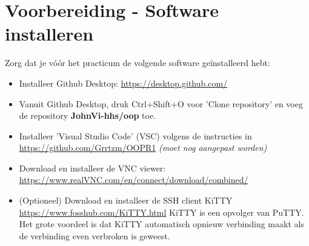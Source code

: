 \section{Voorbereiding - Software installeren}
Zorg dat je vóór het practicum de volgende software geïnstalleerd hebt:
\begin{itemize}
\item Installeer Github Desktop: \url{https://desktop.github.com/}
\item Vanuit Github Desktop, druk Ctrl+Shift+O voor 'Clone repository' en voeg de repository \textbf{JohnVi-hhs/oop} toe.
\item Installeer 'Visual Studio Code' (VSC) volgens de instructies in \newline \url{https://github.com/Grrtzm/OOPR1} \textit{(moet nog aangepast worden)}
\item Download en installeer de VNC viewer:  \newline \url{https://www.realVNC.com/en/connect/download/combined/}
\item (Optioneel) Download en installeer de SSH client KiTTY  \newline \url{https://www.fosshub.com/KiTTY.html} \newline
KiTTY is een opvolger van PuTTY. Het grote voordeel is dat KiTTY automatisch opnieuw verbinding maakt als de verbinding even verbroken is geweest.
\end{itemize}

